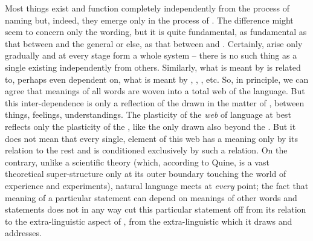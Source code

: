 Most things exist and function completely independently from the process of
naming but, indeed, they emerge only in the process of . The
difference might seem to concern only the wording, but it is quite fundamental,
as fundamental as that between  and the general
 or else, as that between  and . 
Certainly,  arise only gradually and at every stage form a
whole system -- there is no such thing
as a single  existing  independently from others.
Similarly, what is meant by  is related to, perhaps even dependent on,
what is meant by , , , etc.  So, in
principle, we can agree that meanings of all words are woven into a total web of
the language.  But this inter-dependence is only a reflection of the
 drawn in the matter of , between things,
feelings, understandings.  The plasticity of the {\em web} of language at best
reflects only the plasticity of the , like the 
 only  drawn also beyond the \hoa.  But it does not
mean that every single,  element of this web has a meaning only by
its relation to the rest and is conditioned exclusively by such a relation.  On
the contrary, unlike a scientific theory (which, according to Quine, is a vast
theoretical super-structure only at its outer boundary touching the world of
experience and experiments), natural language meets  at {\em
  every} point; the fact that meaning of a particular statement can depend on
meanings of other words and statements does not in any way cut this particular
statement off from its relation to the extra-linguistic aspect of
, from the extra-linguistic  which it draws and
addresses.

